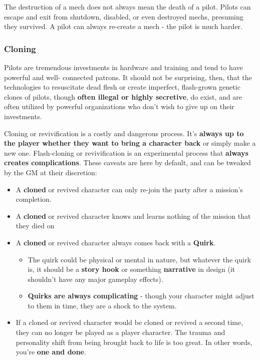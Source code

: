The destruction of a mech does not always mean the death of a pilot. Pilots can escape and exit from shutdown, disabled, or even destroyed mechs, presuming they survived. A pilot can always re-create a mech - the pilot is much harder.

\subsubsection{Cloning}

Pilots are tremendous investments in hardware and training and tend to have powerful and well- connected patrons. It should not be surprising, then, that the technologies to resuscitate dead flesh or create imperfect, flash-grown genetic clones of pilots, though \textbf{often illegal or highly secretive}, do exist, and are often utilized by powerful organizations who don't wish to give up on their investments. 

Cloning or revivification is a costly and dangerous process. It's \textbf{always up to the player whether they want to bring a character back} or simply make a new one. Flash-cloning or revivification is an experimental process that \textbf{always creates complications}. These caveats are here by default, and can be tweaked by the GM at their discretion: 
\begin{itemize}
\item A \textbf{cloned} or revived character can only re-join the party after a mission's completion. 
\item A \textbf{cloned} or revived character knows and learns nothing of the mission that they died on 
\item A \textbf{cloned} or revived character always comes back with a \textbf{Quirk}. 
\begin{itemize}
\item The quirk could be physical or mental in nature, but whatever the quirk is, it should be a \textbf{story hook} or something \textbf{narrative} in design (it shouldn't have any major gameplay effects). 
\item \textbf{Quirks are always complicating} - though your character might adjust to them in time, they are a shock to the system.
\end{itemize}
\item If a cloned or revived character would be cloned or revived a second time, they can no longer be played as a player character. The trauma and personality shift from being brought back to life is too great. In other words, you're \textbf{one and done}.
\end{itemize}

